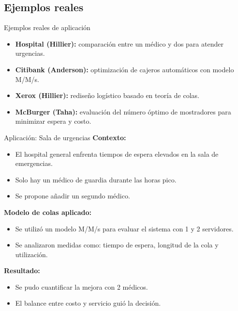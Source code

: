 \documentclass{beamer}
\begin{document}
\subsection{Ejemplos reales}
\begin{frame}{Ejemplos reales de aplicación}
\begin{itemize}
    \item \textbf{Hospital (Hillier):} comparación entre un médico y dos para atender urgencias.
    \item \textbf{Citibank (Anderson):} optimización de cajeros automáticos con modelo M/M/s.
    \item \textbf{Xerox (Hillier):} rediseño logístico basado en teoría de colas.
    \item \textbf{McBurger (Taha):} evaluación del número óptimo de mostradores para minimizar espera y costo.
\end{itemize}
\end{frame}

\begin{frame}{Aplicación: Sala de urgencias}
\textbf{Contexto:}
\begin{itemize}
    \item El hospital general enfrenta tiempos de espera elevados en la sala de emergencias.
    \item Solo hay un médico de guardia durante las horas pico.
    \item Se propone añadir un segundo médico.
\end{itemize}

\textbf{Modelo de colas aplicado:}
\begin{itemize}
    \item Se utilizó un modelo M/M/s para evaluar el sistema con 1 y 2 servidores.
    \item Se analizaron medidas como: tiempo de espera, longitud de la cola y utilización.
\end{itemize}

\textbf{Resultado:}
\begin{itemize}
    \item Se pudo cuantificar la mejora con 2 médicos.
    \item El balance entre costo y servicio guió la decisión.
\end{itemize}
\end{frame}
\end{document}
